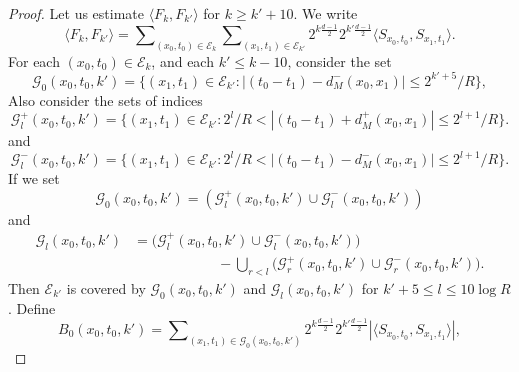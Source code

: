 \begin{proof}
%
%
Let us estimate $\langle F_k, F_{k'} \rangle$ for $k \geq k' + 10$.
We write
%
\begin{equation}
    \langle F_k, F_{k'} \rangle = \sum\nolimits_{(x_0,t_0) \in \mathcal{E}_k} \sum\nolimits_{(x_1,t_1) \in \mathcal{E}_{k'}} 2^{k \frac{d-1}{2}} 2^{k' \frac{d-1}{2}} \langle {S\!}_{x_0,t_0}, {S\!}_{x_1,t_1} \rangle.
\end{equation}
%
For each $(x_0,t_0) \in \mathcal{E}_k$, and each $k' \leq k - 10$, consider the set
%
\begin{equation}
    \mathcal{G}_0(x_0,t_0,k') = \{ (x_1,t_1) \in \mathcal{E}_{k'} : |(t_0 - t_1) - d_M^-(x_0,x_1)| \leq 2^{k' + 5} / R \},
\end{equation}
%
Also consider the sets of indices
%
\begin{equation}
    \mathcal{G}_l^+(x_0,t_0,k') = \{ (x_1,t_1) \in \mathcal{E}_{k'} : 2^{l} / R < |(t_0 - t_1) + d_M^+(x_0,x_1)| \leq 2^{l + 1} / R \}.
\end{equation}
%
and
%
\begin{equation}
    \mathcal{G}_l^-(x_0,t_0,k') = \{ (x_1,t_1) \in \mathcal{E}_{k'} : 2^{l} / R < |(t_0 - t_1) - d_M^-(x_0,x_1)| \leq 2^{l + 1} / R \}.
\end{equation}
%
If we set
%
\begin{equation}
    \mathcal{G}_0(x_0,t_0,k') = (\mathcal{G}_l^+(x_0,t_0,k') \cup \mathcal{G}_l^-(x_0,t_0,k'))
\end{equation}
%
and
%
\begin{equation}
\begin{split}
    \mathcal{G}_l(x_0,t_0,k') &= \Big( \mathcal{G}_l^+(x_0,t_0,k') \cup \mathcal{G}_l^-(x_0,t_0,k') \Big)\\
    &\quad\quad\quad\quad\quad\quad - \bigcup\nolimits_{r < l} \Big(\mathcal{G}_r^+(x_0,t_0,k') \cup \mathcal{G}_r^-(x_0,t_0,k') \Big).
\end{split}
\end{equation}
%
Then $\mathcal{E}_{k'}$ is covered by $\mathcal{G}_0(x_0,t_0,k')$ and $\mathcal{G}_l(x_0,t_0,k')$ for $k' + 5 \leq l \leq 10 \log R$. Define
%
\begin{equation}
    B_0(x_0,t_0,k') = \sum\nolimits_{(x_1,t_1) \in \mathcal{G}_0(x_0,t_0,k')} 2^{k \frac{d-1}{2}} 2^{k' \frac{d-1}{2}} |\langle {S\!}_{x_0,t_0}, {S\!}_{x_1,t_1} \rangle|,

\end{equation}
\end{proof}
